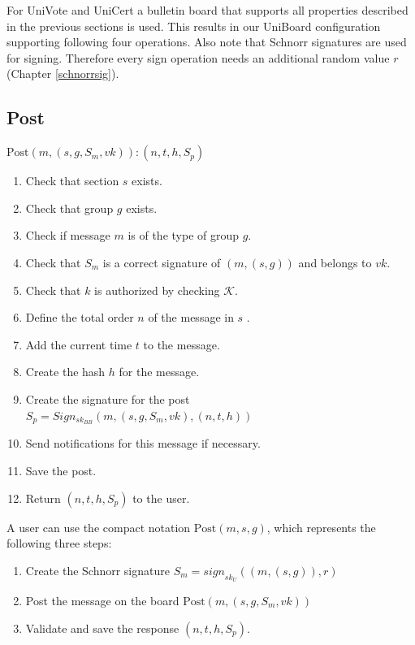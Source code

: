 \documentclass[bibtotoc,halfparskip,oneside]{scrreprt}
\begin{document}
For UniVote and UniCert a bulletin board that supports all properties described in the previous sections is used. This results in our UniBoard configuration supporting following four operations. Also note that Schnorr signatures are used for signing. Therefore every sign operation needs an additional random value $r$ (Chapter \ref{schnorrsig}).

\subsection{Post}
 $\mathrm{Post}(m, (s, g, S_m, vk)):(n, t , h, S_p)$
\begin{enumerate}
	\item Check that section $s$ exists.
	\item Check that group $g$ exists.
	\item Check if message $m$ is of the type of group $g$.
	\item Check that $S_m$ is a correct signature of $(m, (s, g))$ and belongs to $vk$.
	\item Check that $k$ is authorized by checking $\mathcal{K}$.
	\item Define the total order $n$ of the message in $s$ .
	\item Add the current time $t$ to the message.
	\item Create the hash $h$ for the message.
	\item Create the signature for the post $S_p=Sign_{sk_{BB}}(m, (s, g, S_m , vk), (n, t, h))$
	\item Send notifications for this message if necessary.
	\item Save the post.
	\item Return $(n, t, h, S_p)$ to the user.
\end{enumerate}

A user can use the compact notation $\mathrm{Post}(m, s, g)$, which represents the following three steps:
\begin{enumerate}
	\item Create the Schnorr signature $S_m=\mathit{sign}_{sk_U}((m,(s,g)),r)$
	\item Post the message on the board $\mathrm{Post}(m, (s, g, S_m, vk))$
	\item Validate and save the response $(n, t , h, S_p)$.
\end{enumerate}
\end{document}
